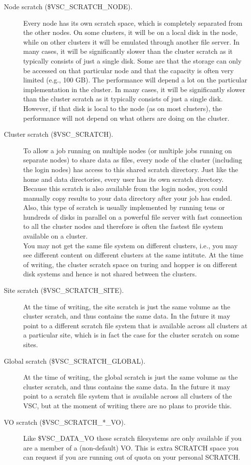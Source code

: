\begin{description}
\item[Node scratch (\$VSC\_SCRATCH\_NODE).]
Every node has its own scratch space, which is completely separated from the other nodes.
On some clusters, it will be on a local disk in the node, while on other
clusters it will be emulated through another file server. In many cases,
it will be significantly slower than the cluster scratch as it typically
consists of just a single disk.
Some  are that the storage
can only be accessed on that particular node and that the capacity is often very limited (e.g., 100 GB).
The performance will depend a lot on the particular implementation in the cluster. In many cases,
it will be significantly slower than the cluster scratch as it typically
consists of just a single disk. However, if that disk is local to the node
(as on most clusters), the performance will not depend on what others are
doing on the cluster.
\item[Cluster scratch (\$VSC\_SCRATCH).]
To allow a job running on multiple nodes (or multiple jobs running on
separate nodes) to share data as files, every node of the cluster
(including the login nodes) has access to this shared scratch directory.
Just like the home and data directories, every user has its own scratch
directory. Because this scratch is also available from the login nodes, you
could manually copy results to your data directory after your job has
ended. Also, this type of scratch is usually implemented by running tens or
hundreds of disks in parallel on a powerful file server with fast connection
to all the cluster nodes and therefore is often the fastest file system
available on a cluster. \\
You may not get the same file system on different clusters, i.e., you
may see different content on different clusters at the same intitute.
\ifantwerpen
  At the time of writing, the cluster scratch space on turing and hopper is
  on different disk systems and hence is not shared between the clusters.
\fi
\item[Site scratch (\$VSC\_SCRATCH\_SITE).]
At the time of writing, the site scratch is just the same
volume as the cluster scratch, and thus contains the same data.
In the future it may point to a different scratch file system
that is available across all clusters at a particular site, which is in
fact the case for the cluster scratch on some sites.
\item[Global scratch (\$VSC\_SCRATCH\_GLOBAL).]
At the time of writing, the global scratch is just the same
volume as the cluster scratch, and thus contains the same data.
In the future it may point to a scratch file system
that is available across all clusters of the VSC, but at the moment
of writing there are no plans to provide this.
\ifgent
\item[VO scratch (\$VSC\_SCRATCH\_*\_VO).]
Like \$VSC\_DATA\_VO these scratch filesystems are only available if you
are a member of a (non-default) VO. This is extra SCRATCH space you can request if you are running
out of quota on your personal SCRATCH.
\fi
\end{description}

